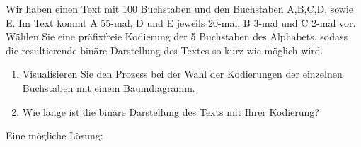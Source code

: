  \begin{myexercise}
Wir haben einen Text mit 100 Buchstaben und den Buchstaben A,B,C,D, sowie E. Im Text kommt A 55-mal, D und E jeweils 20-mal, B 3-mal und C 2-mal vor. Wählen Sie eine präfixfreie Kodierung der 5 Buchstaben des Alphabets, sodass die resultierende binäre Darstellung des Textes so kurz wie möglich wird. 
\begin{enumerate}
\item Visualisieren Sie den Prozess bei der Wahl der Kodierungen der einzelnen Buchstaben mit einem Baumdiagramm. 
\item  Wie lange ist die binäre Darstellung des Texts mit Ihrer Kodierung?
\end{enumerate}
\begin{myanswer}
Eine mögliche Lösung:
\begin{figure}[H]
\centering
{}
\end{figure}
\end{myanswer}
\end{myexercise}
